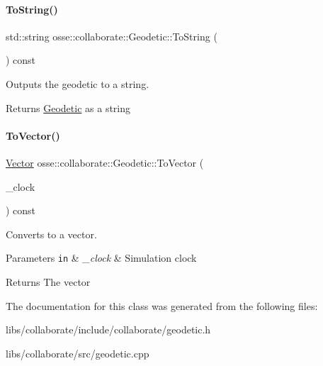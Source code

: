 \paragraph{\texorpdfstring{To\+String()}{ToString()}}
{\footnotesize\ttfamily std\+::string osse\+::collaborate\+::\+Geodetic\+::\+To\+String (\begin{DoxyParamCaption}{ }\end{DoxyParamCaption}) const}



Outputs the geodetic to a string. 

\begin{DoxyReturn}{Returns}
\hyperlink{classosse_1_1collaborate_1_1_geodetic}{Geodetic} as a string 
\end{DoxyReturn}
\mbox{\label{classosse_1_1collaborate_1_1_geodetic_a4a46857018f20a00720e05fe705828ec}} 
\paragraph{\texorpdfstring{To\+Vector()}{ToVector()}}
{\footnotesize\ttfamily \hyperlink{classosse_1_1collaborate_1_1_vector}{Vector} osse\+::collaborate\+::\+Geodetic\+::\+To\+Vector (\begin{DoxyParamCaption}\item[{const \hyperlink{classosse_1_1collaborate_1_1_simulation_clock}{Simulation\+Clock} \&}]{\+\_\+clock }\end{DoxyParamCaption}) const}



Converts to a vector. 


\begin{DoxyParams}[1]{Parameters}
\mbox{\tt in}  & {\em \+\_\+clock} & Simulation clock \\
\hline
\end{DoxyParams}
\begin{DoxyReturn}{Returns}
The vector 
\end{DoxyReturn}


The documentation for this class was generated from the following files\+:\begin{DoxyCompactItemize}
\item 
libs/collaborate/include/collaborate/geodetic.\+h\item 
libs/collaborate/src/geodetic.\+cpp\end{DoxyCompactItemize}
